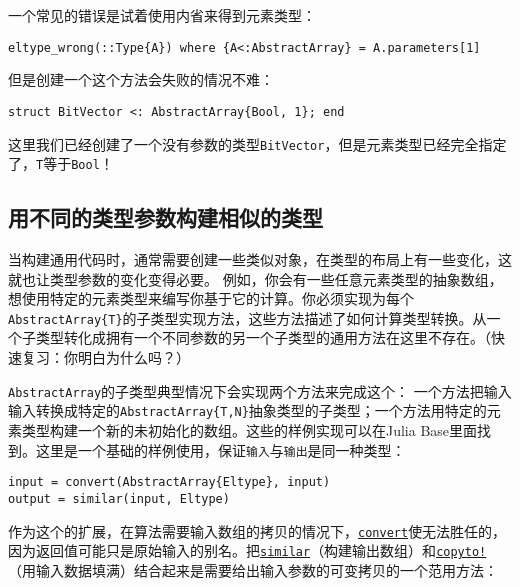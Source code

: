一个常见的错误是试着使用内省来得到元素类型：




\begin{verbatim}
eltype_wrong(::Type{A}) where {A<:AbstractArray} = A.parameters[1]
\end{verbatim}



但是创建一个这个方法会失败的情况不难：




\begin{verbatim}
struct BitVector <: AbstractArray{Bool, 1}; end
\end{verbatim}



这里我们已经创建了一个没有参数的类型\texttt{BitVector}，但是元素类型已经完全指定了，\texttt{T}等于\texttt{Bool}！



\hypertarget{7211262558234007578}{}


\subsection{用不同的类型参数构建相似的类型}



当构建通用代码时，通常需要创建一些类似对象，在类型的布局上有一些变化，这就也让类型参数的变化变得必要。 例如，你会有一些任意元素类型的抽象数组，想使用特定的元素类型来编写你基于它的计算。你必须实现为每个\texttt{AbstractArray\{T\}}的子类型实现方法，这些方法描述了如何计算类型转换。从一个子类型转化成拥有一个不同参数的另一个子类型的通用方法在这里不存在。（快速复习：你明白为什么吗？）



\texttt{AbstractArray}的子类型典型情况下会实现两个方法来完成这个： 一个方法把输入输入转换成特定的\texttt{AbstractArray\{T,N\}}抽象类型的子类型；一个方法用特定的元素类型构建一个新的未初始化的数组。这些的样例实现可以在Julia Base里面找到。这里是一个基础的样例使用，保证\texttt{输入}与\texttt{输出}是同一种类型：




\begin{verbatim}
input = convert(AbstractArray{Eltype}, input)
output = similar(input, Eltype)
\end{verbatim}



作为这个的扩展，在算法需要输入数组的拷贝的情况下，\hyperlink{1846942650946171605}{\texttt{convert}}使无法胜任的，因为返回值可能只是原始输入的别名。把\hyperlink{15525808546723795098}{\texttt{similar}}（构建输出数组）和\hyperlink{12476124489163612623}{\texttt{copyto!}}（用输入数据填满）结合起来是需要给出输入参数的可变拷贝的一个范用方法：




